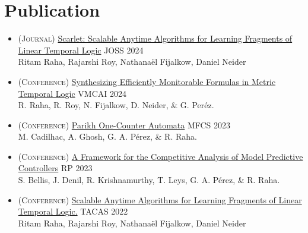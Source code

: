 \documentclass[a4paper,10pt]{article}
\begin{document}
\section{Publication}
\begin{itemize}

	\item \textsc{(Journal)}
    \href{https://joss.theoj.org/papers/10.21105/joss.05052}{Scarlet: Scalable Anytime Algorithms for Learning Fragments of Linear Temporal Logic} JOSS 2024\\
    Ritam Raha, Rajarshi Roy, Nathana\"el Fijalkow, Daniel Neider
    \\
	\item \textsc{(Conference)}
    \href{https://link.springer.com/chapter/10.1007/978-3-031-50521-8_13}{Synthesizing Efficiently Monitorable Formulas in Metric Temporal Logic} VMCAI 2024\\
    R. Raha, R. Roy, N. Fijalkow, D. Neider, & G. Peréz.
    \\	
	\item \textsc{(Conference)}
    \href{https://drops.dagstuhl.de/entities/document/10.4230/LIPIcs.MFCS.2023.30}{Parikh One-Counter Automata} MFCS 2023\\
    M. Cadilhac, A. Ghosh, G. A. Pérez, & R. Raha.
    \\

	\item \textsc{(Conference)}
    \href{https://link.springer.com/chapter/10.1007/978-3-031-45286-4_11}{A Framework for the Competitive Analysis of Model Predictive Controllers} RP 2023\\
    S. Bellis, J. Denil, R. Krishnamurthy, T. Leys, G. A. Pérez, & R. Raha.
    \\
  
    \item \textsc{(Conference)}
    \href{https://link.springer.com/chapter/10.1007/978-3-030-99524-9_14}{Scalable Anytime Algorithms for Learning Fragments of Linear Temporal Logic.} TACAS 2022\\
    Ritam Raha, Rajarshi Roy, Nathana\"el Fijalkow, Daniel Neider\\
    \\
    

\end{itemize}
\end{document}
